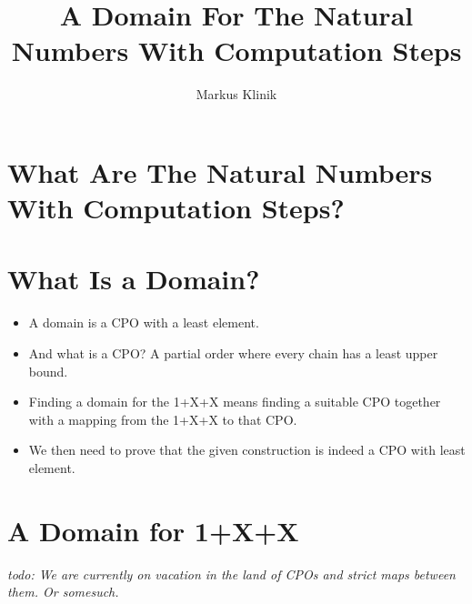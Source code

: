 \documentclass[a4paper]{article}
\newcommand{\todo}[1]{\bigskip \noindent \emph{todo: #1}}
\begin{document}
\title{A Domain For The Natural Numbers With Computation Steps}
\author{Markus Klinik}
\maketitle


\section{What Are The Natural Numbers With Computation Steps?}

\section{What Is a Domain?}

\begin{itemize}

\item A domain is a CPO with a least element.

\item And what is a CPO?  A partial order where every chain has a least upper bound.

\item Finding a domain for the 1+X+X means finding a suitable CPO
together with a mapping from the 1+X+X to that CPO.

\item We then need to prove that the given construction is indeed a CPO with
least element.

\end{itemize}

\section{A Domain for 1+X+X}

\todo{We are currently on vacation in the land of CPOs and strict maps between them.
Or somesuch.}
\end{document}
